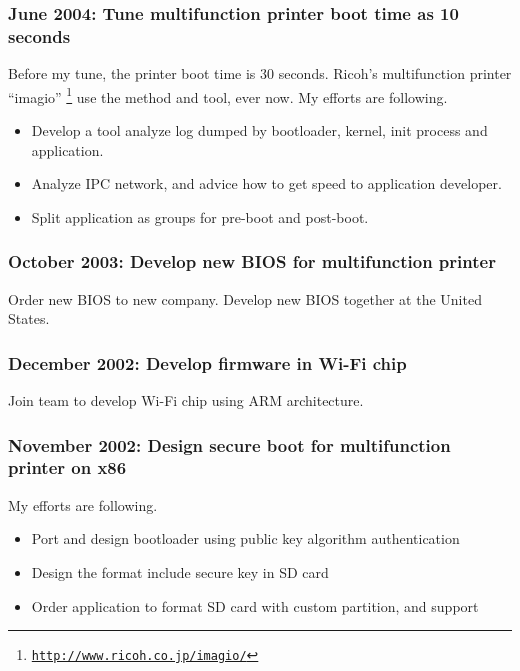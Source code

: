 \documentclass[letterpaper]{article}
\begin{document}
\subsubsection*{June 2004: Tune multifunction printer boot time as 10 seconds}
Before my tune, the printer boot time is 30 seconds.
Ricoh's multifunction printer ``imagio''
\footnote{\href{http://www.ricoh.co.jp/imagio/}{\tt http://www.ricoh.co.jp/imagio/}}
use the method and tool, ever now.
My efforts are following.

\begin{itemize}
  \item Develop a tool analyze log dumped by bootloader, kernel, init process and application.
  \item Analyze IPC network, and advice how to get speed to application developer.
  \item Split application as groups for pre-boot and post-boot.
\end{itemize}

\subsubsection*{October 2003: Develop new BIOS for multifunction printer}
Order new BIOS to new company.
Develop new BIOS together at the United States.

\subsubsection*{December 2002: Develop firmware in Wi-Fi chip}
Join team to develop Wi-Fi chip using ARM architecture.

\subsubsection*{November 2002: Design secure boot for multifunction printer on x86}
My efforts are following.
\begin{itemize}
  \item Port and design bootloader using public key algorithm authentication
  \item Design the format include secure key in SD card
  \item Order application to format SD card with custom partition, and support
\end{itemize}
\end{document}
